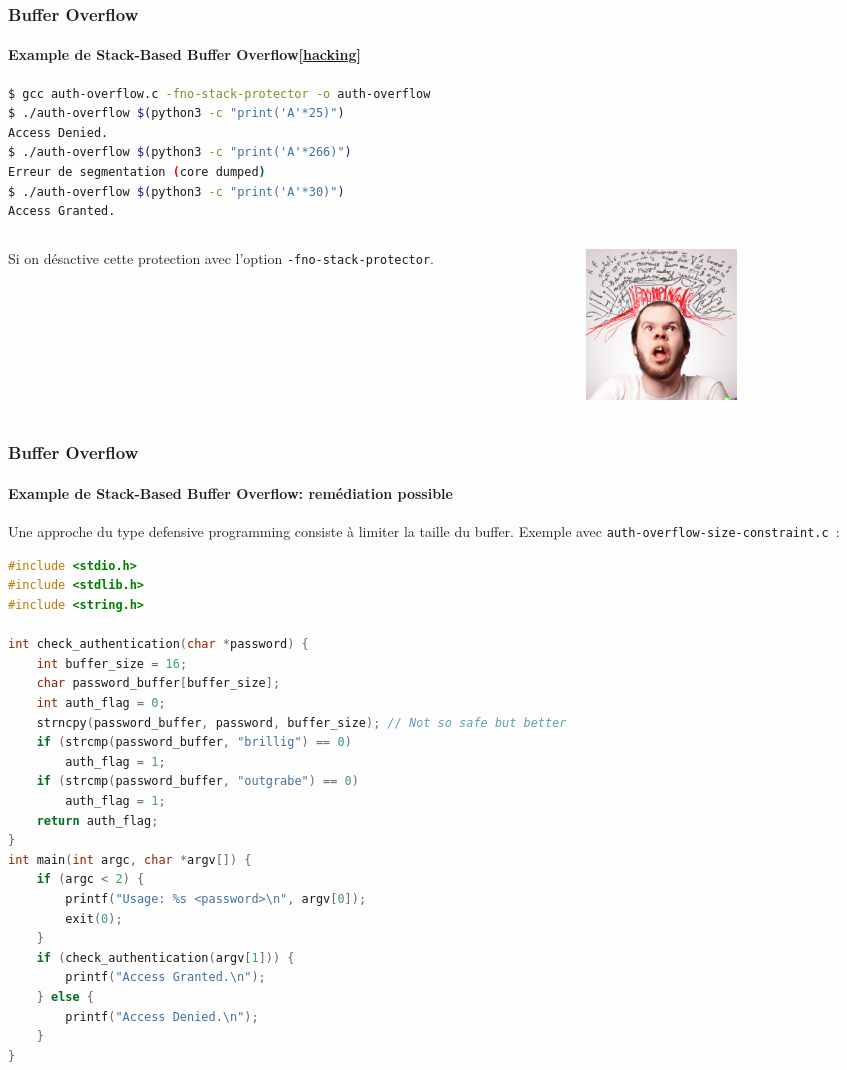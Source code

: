 \documentclass{beamer}
\begin{document}
    \begin{frame}[fragile]
        \frametitle{Buffer Overflow}
        \framesubtitle{Example de Stack-Based Buffer Overflow\cref{hacking}}
        \transdissolve
        \begin{lstlisting}[language=bash]
$ gcc auth-overflow.c -fno-stack-protector -o auth-overflow
$ ./auth-overflow $(python3 -c "print('A'*25)")
Access Denied.
$ ./auth-overflow $(python3 -c "print('A'*266)")
Erreur de segmentation (core dumped)
$ ./auth-overflow $(python3 -c "print('A'*30)")
Access Granted.
        \end{lstlisting}
        \bigbreak
        \begin{columns}
            \begin{column}{0.6\textwidth}
                Si on désactive cette protection avec l'option \lstinline{-fno-stack-protector}.
            \end{column}
            \begin{column}{0.4\textwidth}
                \includegraphics[width=4cm]{image/programmer-head-exploding}
            \end{column}
        \end{columns}
    \end{frame}

    \begin{frame}[fragile]
        \frametitle{Buffer Overflow}
        \framesubtitle{Example de Stack-Based Buffer Overflow: remédiation possible}
        \transdissolve
        Une approche du type defensive programming consiste à limiter la taille du buffer.
        Exemple avec \lstinline{auth-overflow-size-constraint.c}~:
        \begin{lstlisting}[language=C,basicstyle=\tiny\ttfamily]
#include <stdio.h>
#include <stdlib.h>
#include <string.h>

int check_authentication(char *password) {
    int buffer_size = 16;
    char password_buffer[buffer_size];
    int auth_flag = 0;
    strncpy(password_buffer, password, buffer_size); // Not so safe but better
    if (strcmp(password_buffer, "brillig") == 0)
        auth_flag = 1;
    if (strcmp(password_buffer, "outgrabe") == 0)
        auth_flag = 1;
    return auth_flag;
}
int main(int argc, char *argv[]) {
    if (argc < 2) {
        printf("Usage: %s <password>\n", argv[0]);
        exit(0);
    }
    if (check_authentication(argv[1])) {
        printf("Access Granted.\n");
    } else {
        printf("Access Denied.\n");
    }
}
        \end{lstlisting}
    \end{frame}
\end{document}
